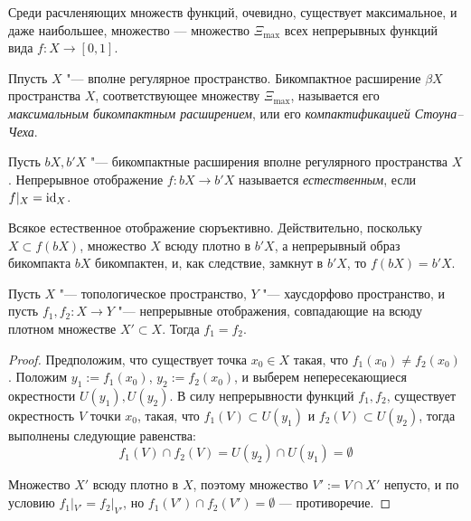 \begin{note}
    Среди расчленяющих множеств функций, очевидно, существует максимальное, и даже наибольшее, множество --- множество $\Xi_{\max}$ всех непрерывных функций вида $f: X \to [0, 1]$.
\end{note}

\begin{definition}
    Ппусть $X$ "--- вполне регулярное пространство. Бикомпактное расширение $\beta X$ пространства $X$, соответствующее множеству $\Xi_{\max}$, называется его \textit{максимальным бикомпактным расширением}, или его \textit{компактификацией Стоуна--Чеха}.
\end{definition}

\begin{definition}
    Пусть $bX, b'X$ "--- бикомпактные расширения вполне регулярного пространства $X$. Непрерывное отображение $f: bX\rightarrow b'X$ называется \textit{естественным}, если $f|_{X} = \mathrm{id}_X$.
\end{definition}

\begin{note}
    Всякое естественное отображение сюръективно. Действительно, поскольку $X \subset f(bX)$, множество $X$ всюду плотно в $b'X$, а непрерывный образ бикомпакта $bX$ бикомпактен, и, как следствие, замкнут в $b'X$, то $f(bX) = b'X$.
\end{note}

\begin{proposition}\label{densesetprop}
    Пусть $X$ "--- топологическое пространство, $Y$ "--- хаусдорфово прост\-ранство, и пусть $f_1, f_2 : X \to Y$ "--- непрерывные отображения, совпадающие на всюду плотном множестве $X' \subset X$. Тогда $f_1 = f_2$.
\end{proposition}

\begin{proof}
    Предположим, что существует точка $x_0 \in X$ такая, что $f_1(x_0) \ne f_2(x_0)$. Положим $y_1 := f_1(x_0)$, $y_2 := f_2(x_0)$, и выберем непересекающиеся окрестности $U(y_1), U(y_2)$. В силу непрерывности функций $f_1, f_2$, существует окрестность $V$ точки $x_0$, такая, что $f_1(V)\subset U(y_1)$ и $f_2(V)\subset U(y_2)$, тогда выполнены следующие равенства:
    \[f_1(V) \cap f_2(V) = U(y_2) \cap U(y_1) = \emptyset\]
    
    Множество $X'$ всюду плотно в $X$, поэтому множество $V' := V\cap X'$ непусто, и по условию $f_1|_{V'} = f_2|_{V'}$, но $f_1(V') \cap f_2(V') = \emptyset$ --- противоречие.
\end{proof}

